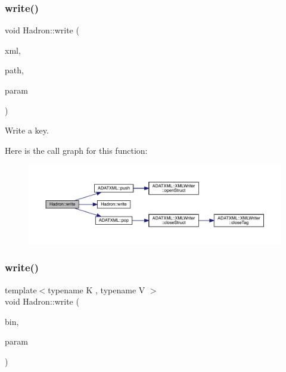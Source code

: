\subsubsection{\texorpdfstring{write()}{write()}\hspace{0.1cm}{\footnotesize\ttfamily [20/95]}}
{\footnotesize\ttfamily void Hadron\+::write (\begin{DoxyParamCaption}\item[{\mbox{\hyperlink{classADATXML_1_1XMLWriter}{X\+M\+L\+Writer}} \&}]{xml,  }\item[{const std\+::string \&}]{path,  }\item[{const \mbox{\hyperlink{structHadron_1_1KeyTetraQuarkElementalOperator__t}{Key\+Tetra\+Quark\+Elemental\+Operator\+\_\+t}} \&}]{param }\end{DoxyParamCaption})}



Write a key. 

Here is the call graph for this function\+:
\nopagebreak
\begin{figure}[H]
\begin{center}
\leavevmode
\includegraphics[width=350pt]{d1/daf/namespaceHadron_a4b91e53beed52be0c8431a4464285dfd_cgraph}
\end{center}
\end{figure}
\mbox{\label{namespaceHadron_a67e12d192d662851e588e9f3504ec45e}} 
\subsubsection{\texorpdfstring{write()}{write()}\hspace{0.1cm}{\footnotesize\ttfamily [21/95]}}
{\footnotesize\ttfamily template$<$typename K , typename V $>$ \\
void Hadron\+::write (\begin{DoxyParamCaption}\item[{\mbox{\hyperlink{classADATIO_1_1BinaryWriter}{Binary\+Writer}} \&}]{bin,  }\item[{const \mbox{\hyperlink{structHadron_1_1CGCReturnType}{C\+G\+C\+Return\+Type}}$<$ K, V $>$ \&}]{param }\end{DoxyParamCaption})\hspace{0.3cm}{\ttfamily [inline]}}



